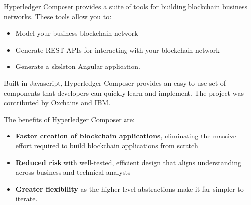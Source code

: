 Hyperledger Composer provides a suite of tools for building blockchain business networks. These tools allow you to:
\begin{itemize}
	\item Model your business blockchain network
	\item Generate REST APIs for interacting with your blockchain network
	\item Generate a skeleton Angular application.
\end{itemize}

Built in Javascript, Hyperledger Composer provides an easy-to-use set of components that developers can quickly learn and implement. The project was contributed by Oxchains and IBM.

The benefits of Hyperledger Composer are:
\begin{itemize}
	\item \textbf{Faster creation of blockchain applications}, eliminating the massive effort required to build blockchain applications from scratch
	\item \textbf{Reduced risk} with well-tested, efficient design that aligns understanding across business and technical analysts
	\item \textbf{Greater flexibility} as the higher-level abstractions make it far simpler to iterate.
\end{itemize}

